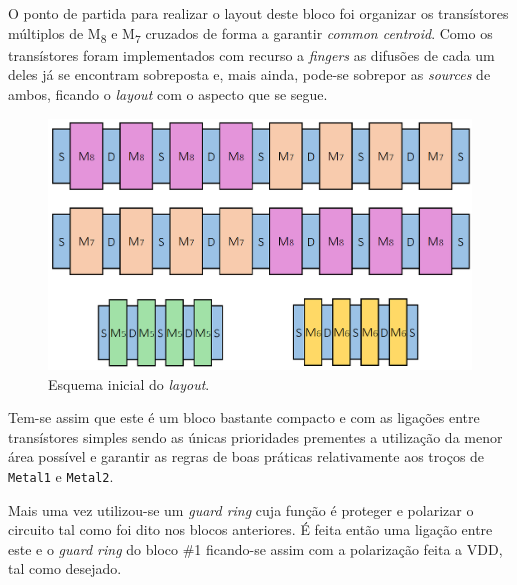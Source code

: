 \documentclass[11pt]{article}
\numberwithin{equation}{section}
\begin{document}
 O ponto de partida para realizar o layout deste bloco foi organizar os transístores múltiplos de M\textsubscript{8} e M\textsubscript{7} cruzados de forma a garantir \textit{common centroid}. Como os transístores foram implementados com recurso a \textit{fingers} as difusões de cada um deles já se encontram sobreposta e, mais ainda, pode-se sobrepor as \textit{sources} de ambos, ficando o \textit{layout} com o aspecto que se segue.
 
\begin{figure}[H]
	\centering
	\includegraphics[keepaspectratio=true, scale=0.35]{teoricas/layout/cc3_1}
	\vspace{-0.5em}
	\caption{Esquema inicial do \textit{layout}.}
	\vspace{-0.8em} 
\end{figure}

Tem-se assim que este é um bloco bastante compacto e com as ligações entre transístores simples sendo as únicas prioridades prementes a utilização da menor área possível e garantir as regras de boas práticas relativamente aos troços de \texttt{Metal1} e \texttt{Metal2}.

Mais uma vez utilizou-se um \textit{guard ring} cuja função é proteger e polarizar o circuito tal como foi dito nos blocos anteriores. É feita então uma ligação entre este e o \textit{guard ring} do bloco \#1 ficando-se assim com a polarização feita a VDD, tal como desejado.
\end{document}
